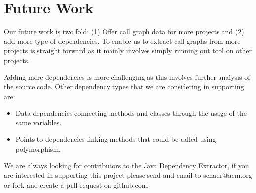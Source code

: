 \documentclass[conference]{IEEEtran}
\begin{document}
\section{Future Work}
\label{sec:fw}
Our future work is two fold:
(1) Offer call graph data for more projects and
(2) add more type of dependencies.
To enable us to extract call graphs from more projects is straight forward as it mainly involves simply running out tool on other projects.

Adding more dependencies is more challenging as this involves further analysis of the source code.
Other dependency types that we are considering in supporting are:
\begin{itemize}
\item Data dependencies connecting methods and classes through the usage of the same variables.
\item Points to dependencies linking methods that could be called using polymorphism.
\end{itemize}

We are always looking for contributors to the Java Dependency Extractor, if you are interested in supporting this project please send and email to schadr@acm.org or fork and create a pull request on github.com.





\end{document}
